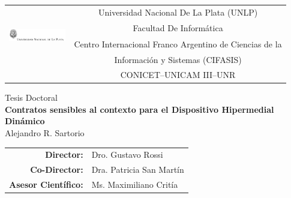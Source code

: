 \thispagestyle{empty}
\begin{titlepage}
\begin{center}
\begin{tabular}{lc}
\multirow{4}{2.5cm}{\includegraphics[width=2.5cm,height=2.5cm]{logo}}
                                                  & \large Universidad Nacional De La Plata (UNLP)\\
                                                  & \large Facultad De Informática \\
                                                  & \large Centro Internacional Franco Argentino de Ciencias de la\\
                                                  & \large Informaci{\'o}n y Sistemas (CIFASIS)\\ & \large CONICET--UNICAM III--UNR\\
\end{tabular}
\end{center}
\vspace{2cm}
\begin{center}
\huge Tesis Doctoral\\
\vspace{2cm}
\huge{\textbf{Contratos sensibles al contexto para el Dispositivo Hipermedial Dinámico}}\\
\vspace{2cm}
\huge Alejandro R. Sartorio\\
\vspace{2cm}
\end{center}
\begin{flushright}
\begin{tabular}{rl}
\large \textbf{Director:}& Dro. Gustavo Rossi\\
\large \textbf{Co-Director:}& Dra. Patricia San Martín\\
\large \textbf{Asesor Científico:}& Ms. Maximiliano Critía\\

\end{tabular}
\end{flushright}
\end{titlepage}
